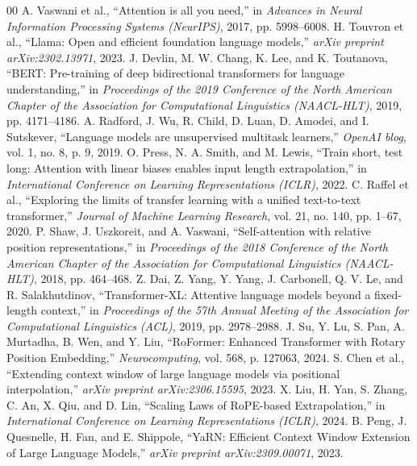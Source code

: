 \documentclass[conference]{IEEEtran}
\begin{document}
\begin{thebibliography}{00}
 A. Vaswani et al., ``Attention is all you need,'' in \emph{Advances in Neural Information Processing Systems (NeurIPS)}, 2017, pp. 5998--6008.
 H. Touvron et al., ``Llama: Open and efficient foundation language models,'' \emph{arXiv preprint arXiv:2302.13971}, 2023.
 J. Devlin, M. W. Chang, K. Lee, and K. Toutanova, ``BERT: Pre-training of deep bidirectional transformers for language understanding,'' in \emph{Proceedings of the 2019 Conference of the North American Chapter of the Association for Computational Linguistics (NAACL-HLT)}, 2019, pp. 4171--4186.
 A. Radford, J. Wu, R. Child, D. Luan, D. Amodei, and I. Sutskever, ``Language models are unsupervised multitask learners,'' \emph{OpenAI blog}, vol. 1, no. 8, p. 9, 2019.
 O. Press, N. A. Smith, and M. Lewis, ``Train short, test long: Attention with linear biases enables input length extrapolation,'' in \emph{International Conference on Learning Representations (ICLR)}, 2022.
 C. Raffel et al., ``Exploring the limits of transfer learning with a unified text-to-text transformer,'' \emph{Journal of Machine Learning Research}, vol. 21, no. 140, pp. 1--67, 2020.
 P. Shaw, J. Uszkoreit, and A. Vaswani, ``Self-attention with relative position representations,'' in \emph{Proceedings of the 2018 Conference of the North American Chapter of the Association for Computational Linguistics (NAACL-HLT)}, 2018, pp. 464--468.
 Z. Dai, Z. Yang, Y. Yang, J. Carbonell, Q. V. Le, and R. Salakhutdinov, ``Transformer-XL: Attentive language models beyond a fixed-length context,'' in \emph{Proceedings of the 57th Annual Meeting of the Association for Computational Linguistics (ACL)}, 2019, pp. 2978--2988.
 J. Su, Y. Lu, S. Pan, A. Murtadha, B. Wen, and Y. Liu, ``RoFormer: Enhanced Transformer with Rotary Position Embedding,'' \emph{Neurocomputing}, vol. 568, p. 127063, 2024.
 S. Chen et al., ``Extending context window of large language models via positional interpolation,'' \emph{arXiv preprint arXiv:2306.15595}, 2023.
 X. Liu, H. Yan, S. Zhang, C. An, X. Qiu, and D. Lin, ``Scaling Laws of RoPE-based Extrapolation,'' in \emph{International Conference on Learning Representations (ICLR)}, 2024.
 B. Peng, J. Quesnelle, H. Fan, and E. Shippole, ``YaRN: Efficient Context Window Extension of Large Language Models,'' \emph{arXiv preprint arXiv:2309.00071}, 2023.

\end{thebibliography}
\end{document}
